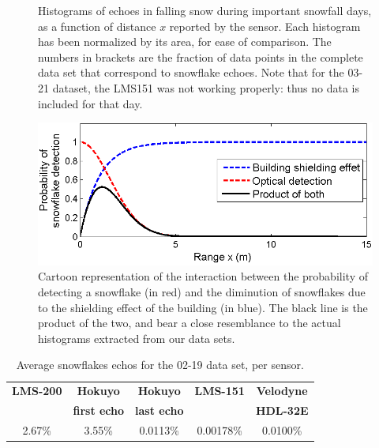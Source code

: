 \begin{figure}[th]
    \caption{Histograms of echoes in falling snow during important snowfall days, as a function of distance $x$ reported by the sensor. Each histogram has been normalized by its area, for ease of comparison. The numbers in brackets are the fraction of data points in the complete data set that correspond to snowflake echoes. Note that for the 03-21 dataset, the LMS151 was not working properly: thus no data is included for that day. }
    \label{fig:Histograms}
\end{figure}

\begin{figure}[th]
    \centering
    \includegraphics[width=0.97\linewidth]{./img/ShieldingModel.png}
    \caption{Cartoon representation of the interaction between the probability of detecting a snowflake (in red) and the diminution of snowflakes due to the shielding effect of the building (in blue). The black line is the product of the two, and bear a close resemblance to the actual histograms extracted from our data sets. }
    \label{fig:CartoonModel}
\end{figure}


\begin{table}[htbp]
    \centering
    \begin{tabular}{|c|c|c|c|c|}
        \hline
        \textbf{LMS-200}       & \textbf{Hokuyo}             & \textbf{Hokuyo}    & \textbf{LMS-151}  & \textbf{Velodyne}  \\
                                        & \textbf{first echo}   & \textbf{last echo}  &                            & \textbf{HDL-32E}  \\\hline
                 2.67\%            &           3.55\%                &       0.0113\%      &       0.00178\%     &  0.0100\%  \\\hline
    \end{tabular}
    \caption{Average snowflakes echos for the 02-19 data set, per sensor.}
    \label{tab:avgRates}
\end{table}

